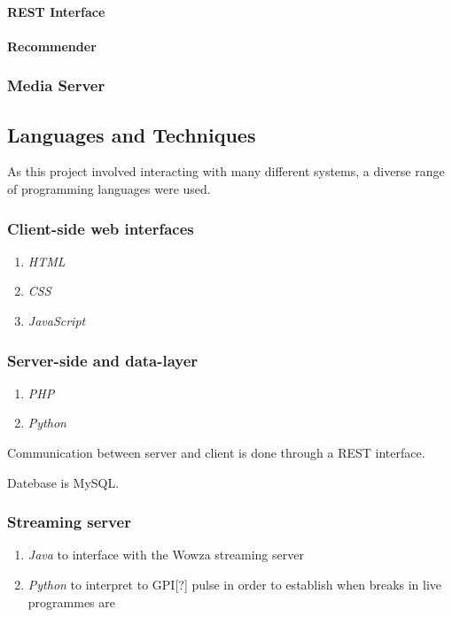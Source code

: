 \paragraph{REST Interface}
\paragraph{Recommender}
\subsubsection{Media Server}



\subsection{Languages and Techniques}
As this project involved interacting with many different systems, a diverse range of programming languages were used.

\subsubsection{Client-side web interfaces}
\begin{enumerate}
\item \textit{HTML}
\item \textit{CSS}
\item \textit{JavaScript}
\end{enumerate}

\subsubsection{Server-side and data-layer}
\begin{enumerate}
\item \textit{PHP}
\item \textit{Python}
\end{enumerate}

Communication between server and client is done through a REST interface.

Datebase is MySQL.

\subsubsection{Streaming server}
\begin{enumerate}
\item \textit{Java} to interface with the Wowza streaming server
\item \textit{Python} to interpret to GPI[?] pulse in order to establish when breaks in live programmes are
\end{enumerate}

